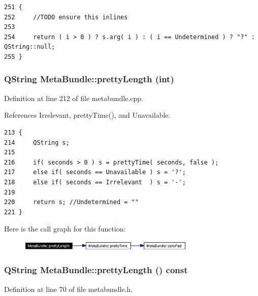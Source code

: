 \footnotesize\begin{verbatim}251 {
252     //TODO ensure this inlines
253 
254     return ( i > 0 ) ? s.arg( i ) : ( i == Undetermined ) ? "?" : QString::null;
255 }
\end{verbatim}\normalsize 
{}
\subsubsection{\setlength{\rightskip}{0pt plus 5cm}QString Meta\-Bundle::pretty\-Length (int)\hspace{0.3cm}{\tt  [static]}}\label{classMetaBundle_MetaBundlee1}




Definition at line 212 of file metabundle.cpp.

References Irrelevant, pretty\-Time(), and Unavailable.



\footnotesize\begin{verbatim}213 {
214     QString s;
215 
216     if( seconds > 0 ) s = prettyTime( seconds, false );
217     else if( seconds == Unavailable ) s = '?';
218     else if( seconds == Irrelevant  ) s = '-';
219 
220     return s; //Undetermined = ""
221 }
\end{verbatim}\normalsize 


Here is the call graph for this function:\begin{figure}[H]
\begin{center}
\leavevmode
\includegraphics[width=239pt]{classMetaBundle_MetaBundlee1_cgraph}
\end{center}
\end{figure}
\subsubsection{\setlength{\rightskip}{0pt plus 5cm}QString Meta\-Bundle::pretty\-Length () const\hspace{0.3cm}{\tt  [inline]}}\label{classMetaBundle_MetaBundlea20}




Definition at line 70 of file metabundle.h.

